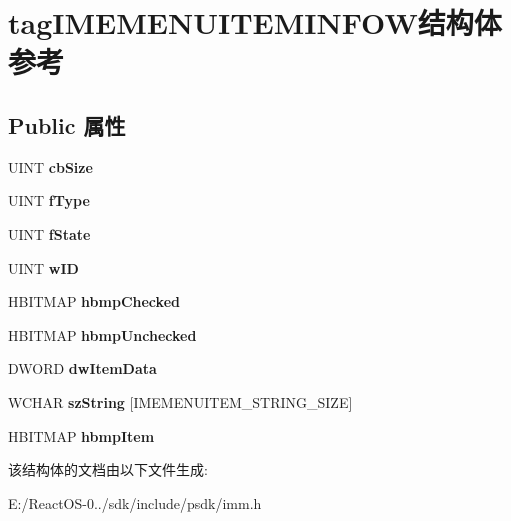 \hypertarget{structtag_i_m_e_m_e_n_u_i_t_e_m_i_n_f_o_w}{}\section{tag\+I\+M\+E\+M\+E\+N\+U\+I\+T\+E\+M\+I\+N\+F\+O\+W结构体 参考}
\label{structtag_i_m_e_m_e_n_u_i_t_e_m_i_n_f_o_w}
\subsection*{Public 属性}
\begin{DoxyCompactItemize}
\item 
\mbox{\label{structtag_i_m_e_m_e_n_u_i_t_e_m_i_n_f_o_w_ad07943538240b2b0f1abc4155956bfe3}} 
U\+I\+NT {\bfseries cb\+Size}
\item 
\mbox{\label{structtag_i_m_e_m_e_n_u_i_t_e_m_i_n_f_o_w_a50becc4221e252dfb3f299b5ad8ca935}} 
U\+I\+NT {\bfseries f\+Type}
\item 
\mbox{\label{structtag_i_m_e_m_e_n_u_i_t_e_m_i_n_f_o_w_a90117805ca1b7d5478d9502fc8ae6c2d}} 
U\+I\+NT {\bfseries f\+State}
\item 
\mbox{\label{structtag_i_m_e_m_e_n_u_i_t_e_m_i_n_f_o_w_a5c84c063d6cd5a359e11b15ce03a4e98}} 
U\+I\+NT {\bfseries w\+ID}
\item 
\mbox{\label{structtag_i_m_e_m_e_n_u_i_t_e_m_i_n_f_o_w_abf6d23444cdde07b5b410e83cde28b1a}} 
H\+B\+I\+T\+M\+AP {\bfseries hbmp\+Checked}
\item 
\mbox{\label{structtag_i_m_e_m_e_n_u_i_t_e_m_i_n_f_o_w_ac0797b078a6912dbe235387675c5d1bf}} 
H\+B\+I\+T\+M\+AP {\bfseries hbmp\+Unchecked}
\item 
\mbox{\label{structtag_i_m_e_m_e_n_u_i_t_e_m_i_n_f_o_w_aeb98788bfa84e98a13c3d7b06ddfd017}} 
D\+W\+O\+RD {\bfseries dw\+Item\+Data}
\item 
\mbox{\label{structtag_i_m_e_m_e_n_u_i_t_e_m_i_n_f_o_w_ac7e44ae28a859efbd5c7da079bcff3ce}} 
W\+C\+H\+AR {\bfseries sz\+String} \mbox{[}I\+M\+E\+M\+E\+N\+U\+I\+T\+E\+M\+\_\+\+S\+T\+R\+I\+N\+G\+\_\+\+S\+I\+ZE\mbox{]}
\item 
\mbox{\label{structtag_i_m_e_m_e_n_u_i_t_e_m_i_n_f_o_w_ac7adad267eb66f1172a83e1eabd4f222}} 
H\+B\+I\+T\+M\+AP {\bfseries hbmp\+Item}
\end{DoxyCompactItemize}


该结构体的文档由以下文件生成\+:\begin{DoxyCompactItemize}
\item 
E\+:/\+React\+O\+S-\/0../sdk/include/psdk/imm.\+h\end{DoxyCompactItemize}
